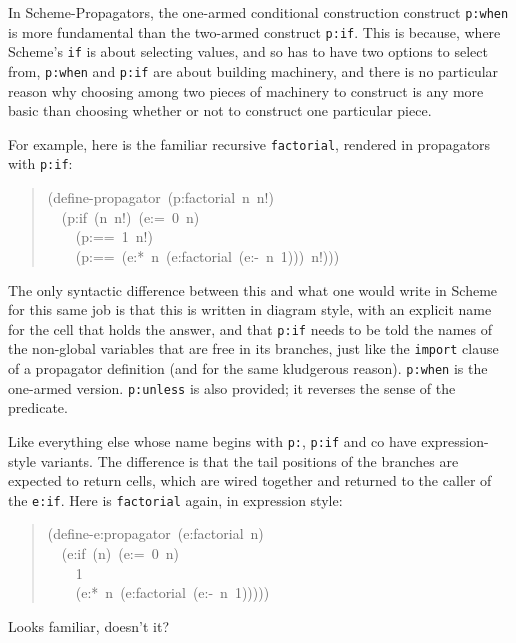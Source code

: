 \documentclass[12pt,letterpaper,english]{article}
\begin{document}
In Scheme-Propagators, the one-armed conditional construction
construct \texttt{p:when} is more fundamental than the two-armed construct
\texttt{p:if}.  This is because, where Scheme's \texttt{if} is about selecting
values, and so has to have two options to select from, \texttt{p:when} and
\texttt{p:if} are about building machinery, and there is no particular
reason why choosing among two pieces of machinery to construct is any
more basic than choosing whether or not to construct one particular
piece.

For example, here is the familiar recursive \texttt{factorial}, rendered in
propagators with \texttt{p:if}:
\begin{quote}{\ttfamily \raggedright \noindent
(define-propagator~(p:factorial~n~n!)~\\
~~(p:if~(n~n!)~(e:=~0~n)~\\
~~~~(p:==~1~n!)~\\
~~~~(p:==~(e:*~n~(e:factorial~(e:-~n~1)))~n!)))
}\end{quote}

The only syntactic difference between this and what one would write in
Scheme for this same job is that this is written in diagram style,
with an explicit name for the cell that holds the answer, and that
\texttt{p:if} needs to be told the names of the non-global variables that
are free in its branches, just like the \texttt{import} clause of a
propagator definition (and for the same kludgerous reason).
\texttt{p:when} is the one-armed version.  \texttt{p:unless} is also provided;
it reverses the sense of the predicate.

Like everything else whose name begins with \texttt{p:}, \texttt{p:if} and co
have expression-style variants.  The difference is that the tail
positions of the branches are expected to return cells, which are
wired together and returned to the caller of the \texttt{e:if}.  Here is
\texttt{factorial} again, in expression style:
\begin{quote}{\ttfamily \raggedright \noindent
(define-e:propagator~(e:factorial~n)~\\
~~(e:if~(n)~(e:=~0~n)~\\
~~~~1~\\
~~~~(e:*~n~(e:factorial~(e:-~n~1)))))
}\end{quote}

Looks familiar, doesn't it?



\hypertarget{using-partial-information}{}
\end{document}
